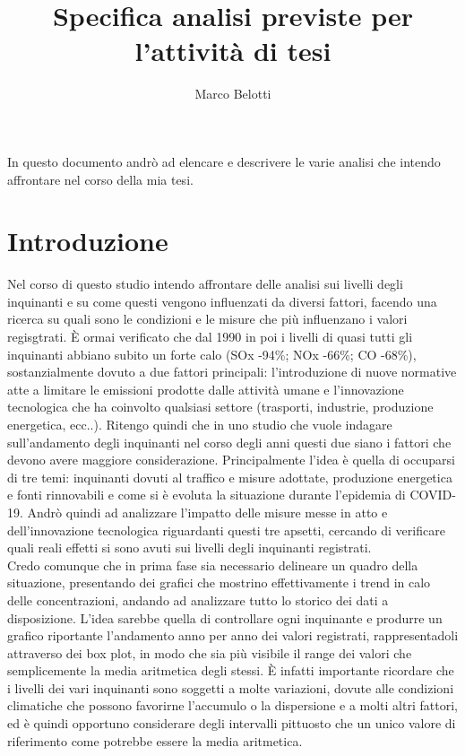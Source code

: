 \documentclass{article}
\title{Specifica analisi previste per l'attività di tesi}
\author{Marco Belotti}
\begin{document}
\maketitle

In questo documento andrò ad elencare e descrivere le varie analisi che intendo affrontare nel corso della mia tesi. 
\newpage

\section{Introduzione}
Nel corso di questo studio intendo affrontare delle analisi sui livelli degli inquinanti e su come questi vengono influenzati da diversi fattori, facendo una ricerca su quali sono le condizioni e le misure che più influenzano i valori regisgtrati. È ormai verificato che dal 1990 in poi i livelli di quasi tutti gli inquinanti abbiano subito un forte calo (SOx -94\%; NOx -66\%; CO -68\%)\cite{iir2020}, sostanzialmente dovuto a due fattori principali: l'introduzione di nuove normative atte a limitare le emissioni prodotte dalle attività umane e l'innovazione tecnologica che ha coinvolto qualsiasi settore (trasporti, industrie, produzione energetica, ecc..). Ritengo quindi che in uno studio che vuole indagare sull'andamento degli inquinanti nel corso degli anni questi due siano i fattori che devono avere maggiore considerazione. Principalmente l'idea è quella di occuparsi di tre temi: inquinanti dovuti al traffico e misure adottate, produzione energetica e fonti rinnovabili e come si è evoluta la situazione durante l'epidemia di COVID-19. Andrò quindi ad analizzare l'impatto delle misure messe in atto e dell'innovazione tecnologica riguardanti questi tre apsetti, cercando di verificare quali reali effetti si sono avuti sui livelli degli inquinanti registrati.
\\Credo comunque che in prima fase sia necessario delineare un quadro della situazione, presentando dei grafici che mostrino effettivamente i trend in calo delle concentrazioni, andando ad analizzare tutto lo storico dei dati a disposizione. L'idea sarebbe quella di controllare ogni inquinante e produrre un grafico riportante l'andamento anno per anno dei valori registrati, rappresentadoli attraverso dei box plot, in modo che sia più visibile il range dei valori che semplicemente la media aritmetica degli stessi. È infatti importante ricordare che i livelli dei vari inquinanti sono soggetti a molte variazioni, dovute alle condizioni climatiche che possono favorirne l'accumulo o la dispersione e a molti altri fattori, ed è quindi opportuno considerare degli intervalli pittuosto che un unico valore di riferimento come potrebbe essere la media aritmetica.
\end{document}
